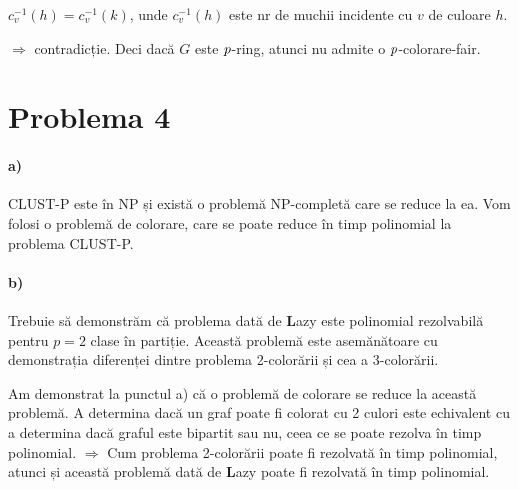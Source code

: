 \documentclass[paper=a4, fontsize=12pt]{scrartcl}
\begin{document}
$c_v^{-1}(h) = c_v^{-1}(k)$, unde $c_v^{-1}(h)$ este nr de muchii incidente cu $v$ de culoare $h$.

$\Rightarrow$ contradicție. Deci dacă $G$ este $\textit p$-ring, atunci nu admite o $\textit p$-colorare-fair.

\section*{Problema 4}
\paragraph{a)}
CLUST-P este în NP și există o problemă NP-completă care se reduce la ea. Vom folosi o problemă de colorare, care se poate
reduce în timp polinomial la problema CLUST-P.

\paragraph{b)}
Trebuie să demonstrăm că problema dată de \textbf{L}azy este polinomial rezolvabilă pentru $p=2$ clase în partiție. 
Această problemă este asemănătoare cu demonstrația diferenței dintre problema 2-colorării și cea a 3-colorării.

Am demonstrat la punctul a) că o problemă de colorare se reduce la această problemă. A determina dacă un graf poate fi colorat cu 2 culori este echivalent cu a determina dacă
graful este bipartit sau nu, ceea ce se poate rezolva în timp polinomial. $\Rightarrow$ Cum problema 2-colorării poate fi rezolvată în timp polinomial,
atunci și această problemă dată de \textbf{L}azy poate fi rezolvată în timp polinomial.
\end{document}
